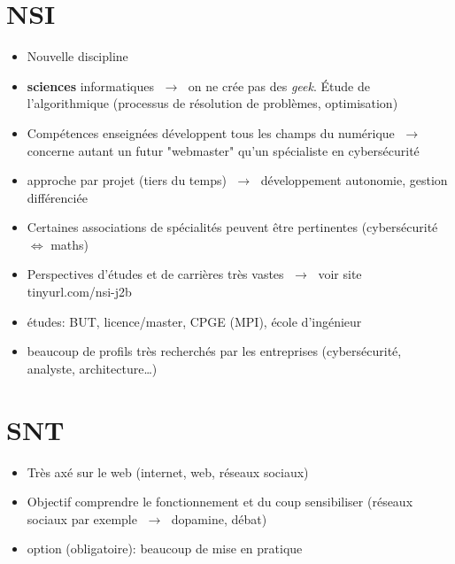 \documentclass[a4paper,11pt]{article}
\begin{document}
\section{NSI}
\begin{itemize}
    \item Nouvelle discipline
    \item \textbf{sciences} informatiques $\;\rightarrow\;$ on ne crée pas des \emph{geek}. Étude de l'algorithmique (processus de résolution de problèmes, optimisation)
    \item Compétences enseignées développent tous les champs du numérique $\;\rightarrow\;$ concerne autant un futur "webmaster" qu'un spécialiste en cybersécurité
    \item approche par projet (tiers du temps) $\;\rightarrow\;$ développement autonomie, gestion différenciée
    \item Certaines associations de spécialités peuvent être pertinentes (cybersécurité $\Longleftrightarrow$ maths)
    \item Perspectives d'études et de carrières très vastes $\;\rightarrow\;$ voir site tinyurl.com/nsi-j2b
    \item études: BUT, licence/master, CPGE (MPI), école d'ingénieur
    \item beaucoup de profils très recherchés par les entreprises (cybersécurité, analyste, architecture\dots)
\end{itemize}
\section{SNT}
\begin{itemize}
    \item Très axé sur le web (internet, web, réseaux sociaux)
    \item Objectif comprendre le fonctionnement et du coup sensibiliser (réseaux sociaux par exemple $\;\rightarrow\;$ dopamine, débat)
    \item option (obligatoire): beaucoup de mise en pratique
\end{itemize}
\end{document}
